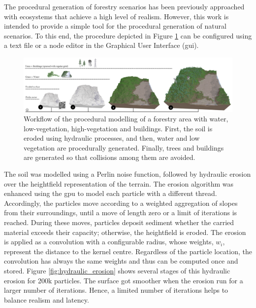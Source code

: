 The procedural generation of forestry scenarios has been previously approached with ecosystems \cite{cordonnier_authoring_2017, fischer_autobiomes_2020, makowski_synthetic_2019} that achieve a high level of realism. However, this work is intended to provide a simple tool for the procedural generation of natural scenarios. To this end, the procedure depicted in Figure \ref{fig:procedural_workflow} can be configured using a text file or a node editor in the Graphical User Interface (\acrshort{gui}).

\begin{figure}
    \centering
    \includegraphics[width=\linewidth]{figs/lidar_simulation/procedural_workflow.png}
	\caption{Workflow of the procedural modelling of a forestry area with water, low-vegetation, high-vegetation and buildings. First, the soil is eroded using hydraulic processes, and then, water and low vegetation are procedurally generated. Finally, trees and buildings are generated so that collisions among them are avoided. }
	\label{fig:procedural_workflow}
\end{figure}

The soil was modelled using a Perlin noise function, followed by hydraulic erosion over the heightfield representation of the terrain. The erosion algorithm was enhanced using the \acrshort{gpu} to model each particle with a different thread. Accordingly, the particles move according to a weighted aggregation of slopes from their surroundings, until a move of length zero or a limit of iterations is reached. During these moves, particles deposit sediment whether the carried material exceeds their capacity; otherwise, the heightfield is eroded. The erosion is applied as a convolution with a configurable radius, whose weights, $w_i$, represent the distance to the kernel centre. Regardless of the particle location, the convolution has always the same weights and thus can be computed once and stored. Figure \ref{fig:hydraulic_erosion} shows several stages of this hydraulic erosion for 200k particles. The surface got smoother when the erosion run for a larger number of iterations. Hence, a limited number of iterations helps to balance realism and latency. 

